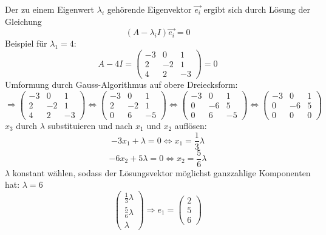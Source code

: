 Der zu einem Eigenwert $\lambda_i$ gehörende Eigenvektor $\overrightarrow{e_i}$ ergibt sich durch Lösung der Gleichung
\begin{equation}
	(A - \lambda_i I)\overrightarrow{e_i} = 0
\end{equation}
Beispiel für $\lambda_1 = 4$:
\begin{displaymath}
	A - 4I = \left(\begin{matrix} -3 & 0 & 1 \\ 2 & -2 & 1 \\ 4 & 2 & -3\end{matrix}\right) = 0
\end{displaymath}
Umformung durch Gauss-Algorithmus auf obere Dreiecksform:
\begin{displaymath} 
	\Rightarrow \left(\begin{matrix} -3 & 0 & 1 \\ 2 & -2 & 1 \\ 4 & 2 & -3\end{matrix}\right) \Leftrightarrow
	\left(\begin{matrix} -3 & 0 & 1 \\ 2 & -2 & 1 \\ 0 & 6 & -5\end{matrix}\right) \Leftrightarrow
	\left(\begin{matrix} -3 & 0 & 1 \\ 0 & -6 & 5 \\ 0 & 6 & -5\end{matrix}\right) \Leftrightarrow
	\left(\begin{matrix} -3 & 0 & 1 \\ 0 & -6 & 5 \\ 0 & 0 & 0\end{matrix}\right)
\end{displaymath}
$x_3$ durch $\lambda$ substituieren und nach $x_1$ und $x_2$ auflösen:
\begin{displaymath}
	-3x_1 + \lambda = 0 \Leftrightarrow x_1 = \frac{1}{3}\lambda
\end{displaymath} 
\begin{displaymath}
	-6x_2 + 5\lambda = 0 \Leftrightarrow x_2 = \frac{5}{6} \lambda
\end{displaymath}
$\lambda$ konstant wählen, sodass der Lösungsvektor möglichst ganzzahlige Komponenten hat: $\lambda = 6$
\begin{displaymath}
	\left(\begin{matrix}\frac{1}{3}\lambda\\\frac{5}{6} \lambda\\\lambda\end{matrix}\right) \Rightarrow
	e_1 = \left(\begin{matrix}2\\5\\6\end{matrix}\right)
\end{displaymath}